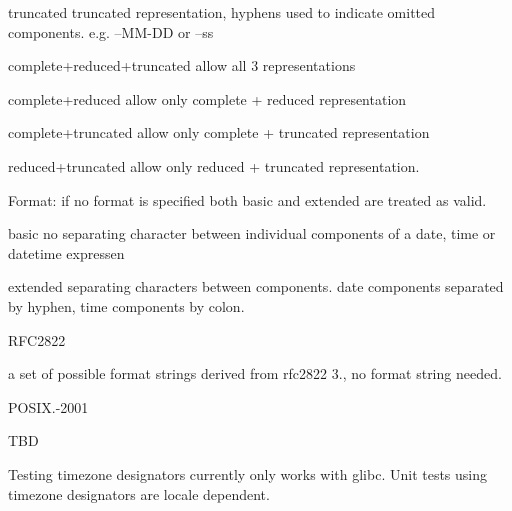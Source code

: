 \begin{DoxyItemize}
\begin{DoxyItemize}
\begin{DoxyItemize}
\item {\ttfamily truncated} truncated representation, hyphens used to indicate omitted components. e.\+g. --M\+M-\/\+DD or --ss
\item {\ttfamily complete+reduced+truncated} allow all 3 representations
\item {\ttfamily complete+reduced} allow only {\ttfamily complete} + {\ttfamily reduced} representation
\item {\ttfamily complete+truncated} allow only {\ttfamily complete} + {\ttfamily truncated} representation
\item {\ttfamily reduced+truncated} allow only {\ttfamily reduced} + {\ttfamily truncated} representation.
\end{DoxyItemize}
\item Format\+: if no format is specified both {\ttfamily basic} and {\ttfamily extended} are treated as valid.
\begin{DoxyItemize}
\item {\ttfamily basic} no separating character between individual components of a {\ttfamily date}, {\ttfamily time} or {\ttfamily datetime} expressen
\item {\ttfamily extended} separating characters between components. {\ttfamily date} components separated by hyphen, {\ttfamily time} components by colon.
\end{DoxyItemize}
\end{DoxyItemize}
\item {\ttfamily R\+F\+C2822}

a set of possible format strings derived from rfc2822 3., no format string needed.
\end{DoxyItemize}

P\+O\+S\+I\+X.-\/2001

T\+BD

Testing timezone designators currently only works with glibc. Unit tests using timezone designators are locale dependent. 